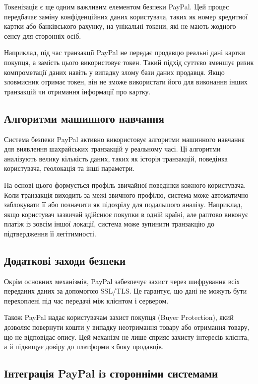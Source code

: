Токенізація є ще одним важливим елементом безпеки PayPal. Цей процес передбачає заміну конфіденційних даних користувача, таких як номер кредитної картки або банківського рахунку, на унікальні токени, які не мають жодного сенсу для сторонніх осіб. 

Наприклад, під час транзакції PayPal не передає продавцю реальні дані картки покупця, а замість цього використовує токен. Такий підхід суттєво зменшує ризик компрометації даних навіть у випадку злому бази даних продавця. Якщо зловмисник отримає токен, він не зможе використати його для виконання інших транзакцій чи отримання інформації про картку.

\subsection{Алгоритми машинного навчання}

Система безпеки PayPal активно використовує алгоритми машинного навчання для виявлення шахрайських транзакцій у реальному часі. Ці алгоритми аналізують велику кількість даних, таких як історія транзакцій, поведінка користувача, геолокація та інші параметри. 

На основі цього формується профіль звичайної поведінки кожного користувача. Коли транзакція виходить за межі звичного профілю, система може автоматично заблокувати її або позначити як підозрілу для подальшого аналізу. Наприклад, якщо користувач зазвичай здійснює покупки в одній країні, але раптово виконує платіж із зовсім іншої локації, система може зупинити транзакцію до підтвердження її легітимності.

\subsection{Додаткові заходи безпеки}

Окрім основних механізмів, PayPal забезпечує захист через шифрування всіх переданих даних за допомогою SSL/TLS. Це гарантує, що дані не можуть бути перехоплені під час передачі між клієнтом і сервером. 

Також PayPal надає користувачам захист покупця (Buyer Protection), який дозволяє повернути кошти у випадку неотримання товару або отримання товару, що не відповідає опису. Цей механізм не лише сприяє захисту інтересів клієнта, а й підвищує довіру до платформи з боку продавців.

\subsection{Інтеграція PayPal із сторонніми системами}

